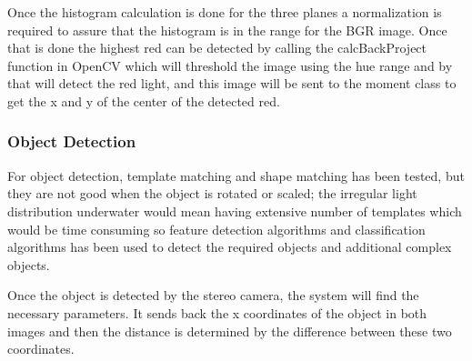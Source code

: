 Once the histogram calculation is done for the three planes a normalization is required to assure that the histogram is in the range for the BGR image. Once that is done the highest red can be detected by calling the calcBackProject function in OpenCV \cite{Histogram_Method_in_opencv} which will threshold the image using the hue range  and by that will detect the red light, and this image will be sent to the moment class to get the x and y of the center of the detected red. 

\subsubsection{Object Detection}
For object detection, template matching and shape matching has been tested, but they are not good when the object is rotated or scaled; the irregular light distribution underwater would mean having extensive number of  templates which would be time consuming so feature detection algorithms and classification algorithms has been used to detect the required objects and additional complex objects.

Once the object is detected by the stereo camera, the system will find the necessary parameters. It sends back the x coordinates of the object in both images and then the distance is determined by the difference between these two coordinates.

